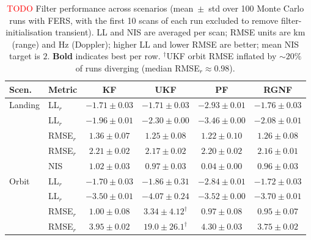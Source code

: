 
\begin{table}[t]
\centering
\caption{\textcolor{red}{TODO} Filter performance across scenarios (mean~$\pm$~std over 100 Monte Carlo runs with FERS, with the first 10 scans of each run excluded to remove filter-initialisation transient). LL and NIS are averaged per scan; RMSE units are km (range) and Hz (Doppler); higher LL and lower RMSE are better; mean NIS target is $2$. \textbf{Bold} indicates best per row. $^{\dagger}$UKF orbit RMSE inflated by ${\sim}20\%$ of runs diverging (median RMSE$_r \approx 0.98$).}
\label{tab:filter_perf}
\setlength{\tabcolsep}{2pt}
\scriptsize
\begin{tabular*}{\columnwidth}{@{\extracolsep{\fill}}llcccc@{}}
\toprule
\textbf{Scen.} & \textbf{Metric} & \textbf{KF} & \textbf{UKF} & \textbf{PF} & \textbf{RGNF} \\
\midrule
Landing & LL$_r$        & $-1.71{\pm}0.03$ & $\mathbf{-1.71{\pm}0.03}$ & $-2.93{\pm}0.01$ & $-1.76{\pm}0.03$ \\
        & LL$_{\dot r}$ & $\mathbf{-1.96{\pm}0.01}$ & $-2.30{\pm}0.00$ & $-3.46{\pm}0.00$ & $-2.08{\pm}0.01$ \\
        & RMSE$_r$      & $1.36{\pm}0.07$ & $1.25{\pm}0.08$ & $\mathbf{1.22{\pm}0.10}$ & $1.26{\pm}0.08$ \\
        & RMSE$_{\dot r}$ & $2.21{\pm}0.02$ & $2.17{\pm}0.02$ & $2.20{\pm}0.02$ & $\mathbf{2.16{\pm}0.01}$ \\
        & NIS           & $\mathbf{1.02{\pm}0.03}$ & $0.97{\pm}0.03$ & $0.04{\pm}0.00$ & $0.96{\pm}0.03$ \\
\addlinespace
Orbit & LL$_r$        & $\mathbf{-1.70{\pm}0.03}$ & $-1.86{\pm}0.31$ & $-2.84{\pm}0.01$ & $-1.72{\pm}0.03$ \\
      & LL$_{\dot r}$ & $\mathbf{-3.50{\pm}0.01}$ & $-4.07{\pm}0.24$ & $-3.52{\pm}0.00$ & $-3.70{\pm}0.01$ \\
      & RMSE$_r$      & $1.00{\pm}0.08$ & $3.34{\pm}4.12^{\dagger}$ & $0.97{\pm}0.08$ & $\mathbf{0.95{\pm}0.07}$ \\
      & RMSE$_{\dot r}$ & $3.95{\pm}0.02$ & $19.0{\pm}26.1^{\dagger}$ & $4.30{\pm}0.03$ & $\mathbf{3.75{\pm}0.02}$ \\

\end{tabular*}
\end{table}
